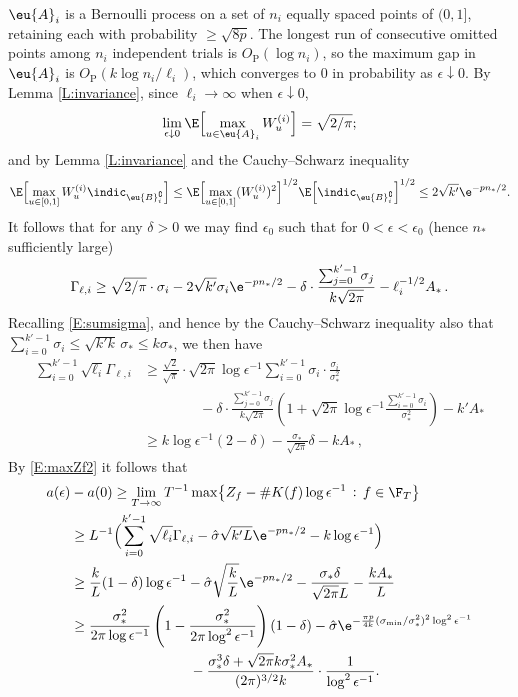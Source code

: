 \documentclass[11pt]{amsart}
\begin{document}
$\eu{A}_i$ is a Bernoulli process on a set of $n_i$ equally spaced points of $(0,1]$, retaining each with probability $\ge \sqrt{8p}$.
The longest run of consecutive omitted points among $n_i$ independent trials is $O_{\mathrm{P}}(\log n_i)$, so the maximum gap in $\eu{A}_i$ is $O_{\mathrm{P}}(k\log n_i/\ell_i)$, which converges to 0 in probability as $\epsilon\downarrow 0$.
By Lemma \ref{L:invariance}, since $\ell_i\to\infty$ when $\epsilon\downarrow 0$,
$$
	\lim_{\epsilon\downarrow 0} \E\Bigl[ \max_{u \in \eu{A}_{i}} W_u^{(i)} \Bigr]=\sqrt{2/\pi};
$$
and by Lemma \ref{L:invariance} and the Cauchy--Schwarz inequality
$$
  \E\Bigl[ \max_{u \in [0,1]} W_u^{(i)}  \indic_{\eu{B}^\complement_i}\Bigr] \le  \E\Bigl[ \max_{u \in [0,1]} (W_u^{(i)} )^2\Bigr]^{1/2} \E\Bigl[\indic_{\eu{B}^\complement_i}\Bigr]^{1/2} \le 2\sqrt{k'}\e^{-pn_*/2}.
$$
It follows that for any $\delta>0$ we may find $\epsilon_0$ such that for $0<\epsilon <\epsilon_0$ (hence $n_*$ sufficiently large)
\begin{equation} \label{E:donskerlimit}
	\Gamma_{\ell,i}\ge \sqrt{2/\pi} \cdot \sigma_i - 2\sqrt{k'}\sigma_i \e^{-p n_*/2} -\delta\cdot \frac{\sum_{j=0}^{k'-1} \sigma_j}{k \sqrt{2\pi}}
	-\ell_i^{-1/2} A_* \, .
\end{equation}
Recalling \eqref{E:sumsigma}, and hence by the Cauchy--Schwarz
inequality also that \\
${\sum_{i=0}^{k'-1} \sigma_i \le \sqrt{k'k}\,\sigma_*\le k \sigma_*}$, we then have
\begin{align*}
	\sum_{i=0}^{k'-1} \sqrt{\ell_i} \Gamma_{\ell,i} &\ge \frac{\sqrt{2}}{\sqrt{\pi}}\cdot \sqrt{2\pi}\log \epsilon^{-1}
	\sum_{i=0}^{k'-1} \sigma_i \cdot \frac{\sigma_i}{\sigma_*^2}\\
	&\qquad \qquad - \delta \cdot \frac{\sum_{j=0}^{k'-1} \sigma_j}{k \sqrt{2\pi}} \left(1+ \sqrt{2\pi}\log\epsilon^{-1} \frac{\sum_{i=0}^{k'-1} \sigma_i}{\sigma_*^2}\right) - k' A_*\\
	&\ge k\log\epsilon^{-1} \left( 2 - \delta\right) - \frac{\sigma_*}{\sqrt{2\pi}} \delta - kA_* \, ,
\end{align*}
By \eqref{E:maxZf2} it follows that
\begin{equation} \label{E:aLbound}
	\begin{split}
		a(\epsilon)&-a(0)
		\ge \lim_{T\to\infty}T^{-1}\max\bigl\{ Z_{f}- \# K(f)\log\epsilon^{-1}\, :\, f\in \F_{T} \bigr\}\\
		& \ge
		L^{-1} \Bigl(\sum_{i=0}^{k'-1} \sqrt{\ell_i} \Gamma_{\ell,i} - \hat\sigma \sqrt{k'L}\e^{-p n_*/2} - k\log \epsilon^{-1}  \Bigr) \\
		&\ge \frac{k}{L}(1-\delta) \log\epsilon^{-1} - \hat\sigma \sqrt{\frac{k}{L}}\e^{-p n_*/2} -  \frac{\sigma_* \delta}{\sqrt{2\pi} L } -\frac{ kA_*}{L}\\
		&\ge \frac{\sigma_*^2}{2\pi \log \epsilon^{-1}}
		\left( 1- \frac{\sigma_*^2}{2\pi \log^2 \epsilon^{-1}}  \right)(1-\delta) -
		\hat\sigma \e^{-\frac{\pi p}{4k} (\sigma_{\min}/\sigma_*^2)^2 \log^2 \epsilon^{-1}}\\
		&\hspace*{3cm} -  \frac{\sigma_*^3 \delta + \sqrt{2\pi} k \sigma_*^2 A_*}{(2\pi)^{3/2} k } \cdot \frac{1}{\log^2 \epsilon^{-1}}.
	\end{split}
\end{equation}
\end{document}
